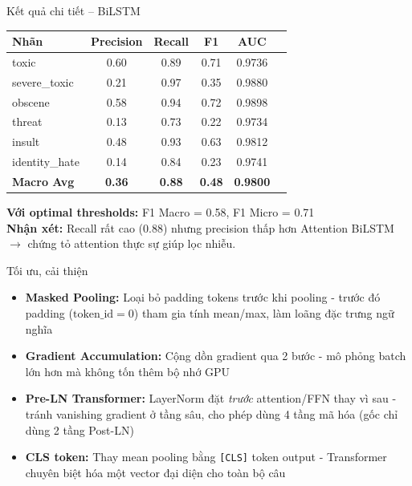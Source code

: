 \documentclass[serif, aspectratio=169]{beamer}
\begin{document}
\begin{frame}{Kết quả chi tiết -- BiLSTM}
\begin{table}
\centering
\small
\begin{tabular}{lccccc}
\toprule
\textbf{Nhãn} & \textbf{Precision} & \textbf{Recall} & \textbf{F1} & \textbf{AUC} \\
\midrule
toxic & 0.60 & 0.89 & 0.71 & 0.9736 \\
severe\_toxic & 0.21 & 0.97 & 0.35 & 0.9880 \\
obscene & 0.58 & 0.94 & 0.72 & 0.9898 \\
threat & 0.13 & 0.73 & 0.22 & 0.9734 \\
insult & 0.48 & 0.93 & 0.63 & 0.9812 \\
identity\_hate & 0.14 & 0.84 & 0.23 & 0.9741 \\
\midrule
\textbf{Macro Avg} & \textbf{0.36} & \textbf{0.88} & \textbf{0.48} & \textbf{0.9800} \\
\bottomrule
\end{tabular}
\end{table}
\vspace{0.2cm}
\textbf{Với optimal thresholds:} F1 Macro = 0.58, F1 Micro = 0.71 \\
\textbf{Nhận xét:} Recall rất cao (0.88) nhưng precision thấp hơn Attention BiLSTM $\rightarrow$ chứng tỏ attention thực sự giúp lọc nhiễu.
\end{frame}

\begin{frame}{Tối ưu, cải thiện}
\begin{itemize}
    \item \textbf{Masked Pooling:} Loại bỏ padding tokens trước khi pooling - trước đó padding ($\text{token\_id}=0$) tham gia tính mean/max, làm loãng đặc trưng ngữ nghĩa
    \item \textbf{Gradient Accumulation:} Cộng dồn gradient qua 2 bước - mô phỏng batch lớn hơn mà không tốn thêm bộ nhớ GPU
    \item \textbf{Pre-LN Transformer:} LayerNorm đặt \textit{trước} attention/FFN thay vì sau - tránh vanishing gradient ở tầng sâu, cho phép dùng 4 tầng mã hóa (gốc chỉ dùng 2 tầng Post-LN)
    \item \textbf{CLS token:} Thay mean pooling bằng \texttt{[CLS]} token output - Transformer chuyên biệt hóa một vector đại diện cho toàn bộ câu
\end{itemize}
\end{frame}
\end{document}
